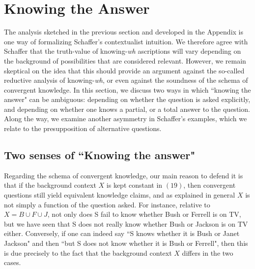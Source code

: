 \section{Knowing the Answer}

The analysis sketched in the previous section and developed in the
Appendix is one way of formalizing Schaffer's contextualist
intuition. We therefore agree with Schaffer that the truth-value
of knowing-\emph{wh} ascriptions will vary depending on the
background of possibilities that are considered relevant. However,
we remain skeptical on the idea that this should provide an
argument against the so-called reductive analysis of
knowing-\emph{wh}, or even against the soundness of the schema of
convergent knowledge. In this section, we discuss two ways in
which ``knowing the answer" can be ambiguous: depending on whether
the question is asked explicitly, and depending on whether one
knows a partial, or a total answer to the question. Along the way,
we examine another asymmetry in Schaffer's examples, which we
relate to the presupposition of alternative questions.

\subsection{Two senses of ``Knowing the answer"}

Regarding the schema of convergent knowledge, our main reason to
defend it is that if the background context $X$ is kept constant
in $(19)$, then convergent questions still yield equivalent
knowledge claims, and as explained in general $X$ is not simply a
function of the question asked. For instance, relative to $X=B\cup
F\cup J$, not only does S fail to know whether Bush or Ferrell is
on TV, but we have seen that S does not really know whether Bush
or Jackson is on TV either. Conversely, if one can indeed say ``S
knows whether it is Bush or Janet Jackson" and then ``but S does
not know whether it is Bush or Ferrell", then this is due
precisely to the fact that the background context $X$ differs in
the two cases.


